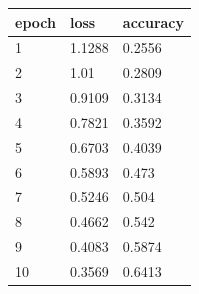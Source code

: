 \begin{tabular}{lll}
\hline
epoch & loss & accuracy \\
\hline
1 & 1.1288 & 0.2556 \\
2 & 1.01 & 0.2809 \\
3 & 0.9109 & 0.3134 \\
4 & 0.7821 & 0.3592 \\
5 & 0.6703 & 0.4039 \\
6 & 0.5893 & 0.473 \\
7 & 0.5246 & 0.504 \\
8 & 0.4662 & 0.542 \\
9 & 0.4083 & 0.5874 \\
10 & 0.3569 & 0.6413 \\
\hline
\end{tabular}
